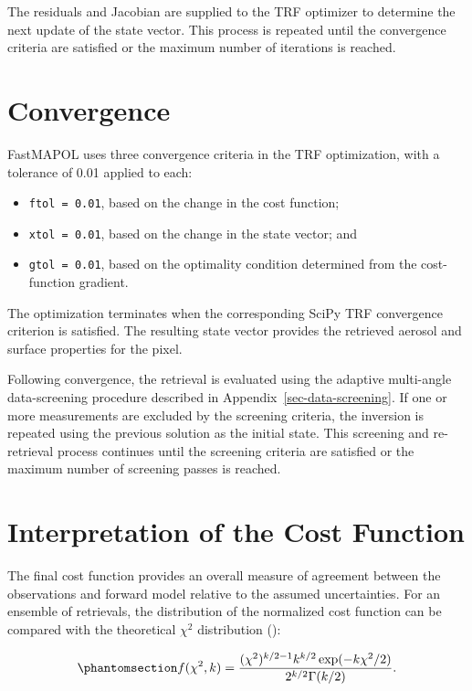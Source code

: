 \documentclass[
  11pt,
  letterpaper,
]{scrreprt}
\providecommand{\tightlist}{%
  \setlength{\itemsep}{0pt}\setlength{\parskip}{0pt}}
\begin{document}
The residuals and Jacobian are supplied to the TRF optimizer to
determine the next update of the state vector. This process is repeated
until the convergence criteria are satisfied or the maximum number of
iterations is reached.

\section{Convergence}\label{convergence}

FastMAPOL uses three convergence criteria in the TRF optimization, with
a tolerance of 0.01 applied to each:

\begin{itemize}
\tightlist
\item
  \texttt{ftol\ =\ 0.01}, based on the change in the cost function;
\item
  \texttt{xtol\ =\ 0.01}, based on the change in the state vector; and
\item
  \texttt{gtol\ =\ 0.01}, based on the optimality condition determined
  from the cost-function gradient.
\end{itemize}

The optimization terminates when the corresponding SciPy TRF convergence
criterion is satisfied. The resulting state vector provides the
retrieved aerosol and surface properties for the pixel.

Following convergence, the retrieval is evaluated using the adaptive
multi-angle data-screening procedure described in
Appendix~\ref{sec-data-screening}. If one or more measurements are
excluded by the screening criteria, the inversion is repeated using the
previous solution as the initial state. This screening and re-retrieval
process continues until the screening criteria are satisfied or the
maximum number of screening passes is reached.

\section{Interpretation of the Cost
Function}\label{interpretation-of-the-cost-function}

The final cost function provides an overall measure of agreement between
the observations and forward model relative to the assumed
uncertainties. For an ensemble of retrievals, the distribution of the
normalized cost function can be compared with the theoretical \(\chi^2\)
distribution ():

\begin{equation}\phantomsection\label{eq-chi2-pdf}{
f(\chi^2,k)
=
\frac{
(\chi^2)^{k/2-1}
k^{k/2}
\exp(-k\chi^2/2)
}{
2^{k/2}\Gamma(k/2)
}.
}\end{equation}
\end{document}

